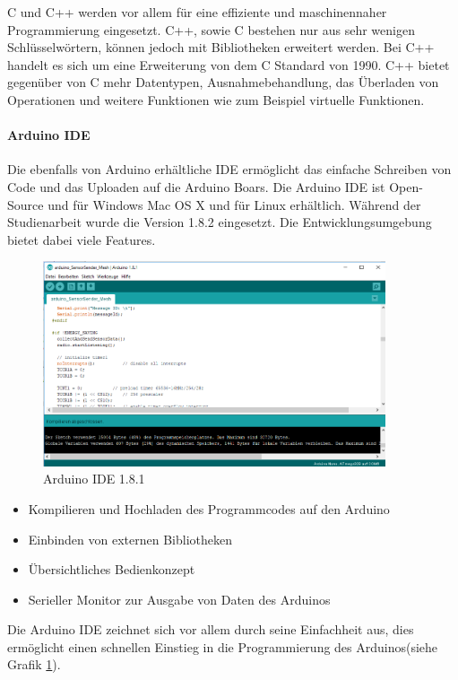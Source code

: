 C und C++ werden vor allem für eine effiziente und maschinennaher Programmierung eingesetzt.  C++, sowie C bestehen nur aus sehr wenigen Schlüsselwörtern, können jedoch mit Bibliotheken erweitert werden. Bei C++ handelt es sich um eine Erweiterung von dem C Standard von 1990. C++ bietet gegenüber von C mehr Datentypen, Ausnahmebehandlung, das Überladen von Operationen und weitere Funktionen wie zum Beispiel virtuelle Funktionen. 

\paragraph{Arduino IDE} Die ebenfalls von Arduino erhältliche IDE ermöglicht das einfache Schreiben von Code und das Uploaden auf die Arduino Boars. Die Arduino IDE ist Open-Source und für Windows Mac OS X und für Linux erhältlich. Während der Studienarbeit wurde die Version 1.8.2 eingesetzt. Die Entwicklungsumgebung bietet dabei viele Features.
\begin{figure}
	\centering
	\includegraphics[width=0.9\textwidth]{bilder/arduinoIDE.png}
	\caption{Arduino IDE  1.8.1}
	\label{img:ArduinoIDE}
\end{figure}

\begin{itemize}
	\item Kompilieren und Hochladen des Programmcodes auf den Arduino
	\item Einbinden von externen Bibliotheken
	\item Übersichtliches Bedienkonzept
	\item Serieller Monitor zur Ausgabe von Daten des Arduinos
\end{itemize}
Die Arduino IDE zeichnet sich vor allem durch seine Einfachheit aus, dies ermöglicht einen schnellen Einstieg in die Programmierung des Arduinos(siehe Grafik \ref{img:ArduinoIDE}). 
